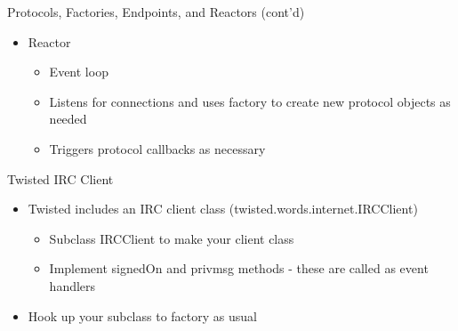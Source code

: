 \documentclass{seminar}
\begin{document}
    \begin{slide}
        \begin{center}{\LARGE Protocols, Factories, Endpoints, and Reactors (cont'd)}\end{center}
        \vspace{1em}
        \begin{itemize}
            \item Reactor
                \begin{itemize}
                    \item Event loop
                    \item Listens for connections and uses factory to create new protocol objects as needed
                    \item Triggers protocol callbacks as necessary
                \end{itemize}
        \end{itemize}
    \end{slide}

    \begin{slide}
        \begin{center}{\LARGE Twisted IRC Client}\end{center}
        \vspace{1em}
        \begin{itemize}
            \item Twisted includes an IRC client class ({\ttfamily twisted.words.internet.IRCClient})
            \begin{itemize}
                \item Subclass {\ttfamily IRCClient} to make your client class
                \item Implement {\ttfamily signedOn} and {\ttfamily privmsg} methods - these are called as event handlers
            \end{itemize}
            \item Hook up your subclass to factory as usual
        \end{itemize}
    \end{slide}
\end{document}
